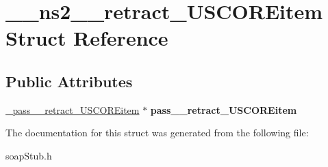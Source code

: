 \hypertarget{struct____ns2____retract__USCOREitem}{
\section{\_\-\_\-ns2\_\-\_\-retract\_\-USCOREitem Struct Reference}
\label{struct____ns2____retract__USCOREitem}
}
\subsection*{Public Attributes}
\begin{DoxyCompactItemize}
\item 
\hypertarget{struct____ns2____retract__USCOREitem_a1b254a9d8de317f7e239531b94932f1f}{
\hyperlink{class__pass____retract__USCOREitem}{\_\-pass\_\-\_\-retract\_\-USCOREitem} $\ast$ {\bfseries pass\_\-\_\-retract\_\-USCOREitem}}
\label{struct____ns2____retract__USCOREitem_a1b254a9d8de317f7e239531b94932f1f}

\end{DoxyCompactItemize}


The documentation for this struct was generated from the following file:\begin{DoxyCompactItemize}
\item 
soapStub.h\end{DoxyCompactItemize}
